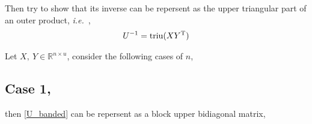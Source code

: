\noindent Then try to show that its inverse can be repersent as the upper triangular part of an outer product,
\textit{i.e.}\ ,
\begin{align}
    U^{-1} = \mathop{\mathrm{triu}}(XY^{\mathrm{T}}) \label{main_eqn}
\end{align}

\noindent Let $X,\ Y \in \mathbb{R}^{n \times u}$, consider the following cases of $n$,

\subsection*{Case 1, }

then \eqref{U_banded} can be repersent as a block upper bidiagonal matrix,


\setcounter{MaxMatrixCols}{30}
